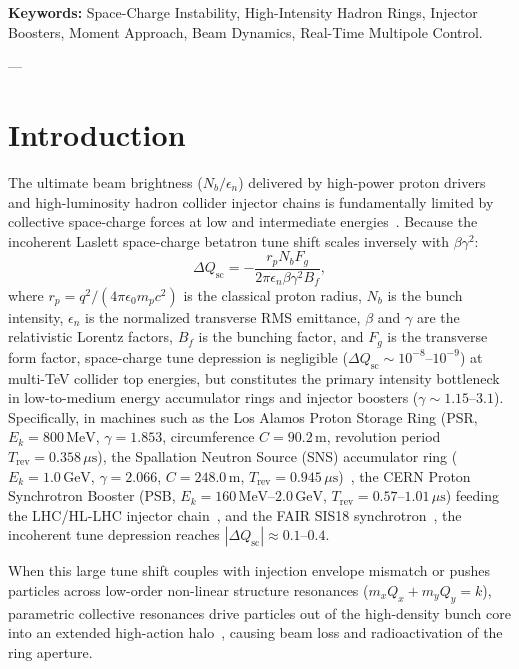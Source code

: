 \documentclass[11pt,a4paper]{article}
\begin{document}
\begin{abstract}
\end{abstract}

\noindent\textbf{Keywords:} Space-Charge Instability, High-Intensity Hadron Rings, Injector Boosters, Moment Approach, Beam Dynamics, Real-Time Multipole Control.

---

\section{Introduction}
The ultimate beam brightness ($N_b / \epsilon_n$) delivered by high-power proton drivers and high-luminosity hadron collider injector chains is fundamentally limited by collective space-charge forces at low and intermediate energies~\cite{reiser2008theory,baartman1998space}. Because the incoherent Laslett space-charge betatron tune shift scales inversely with $\beta \gamma^2$:
\begin{equation}
    \Delta Q_{\mathrm{sc}} = - \frac{r_p N_b F_g}{2 \pi \epsilon_n \beta \gamma^2 B_f},
    \label{eq:tune_shift}
\end{equation}
where $r_p = q^2 / (4\pi \epsilon_0 m_p c^2)$ is the classical proton radius, $N_b$ is the bunch intensity, $\epsilon_n$ is the normalized transverse RMS emittance, $\beta$ and $\gamma$ are the relativistic Lorentz factors, $B_f$ is the bunching factor, and $F_g$ is the transverse form factor, space-charge tune depression is negligible ($\Delta Q_{\mathrm{sc}} \sim 10^{-8}\text{--}10^{-9}$) at multi-TeV collider top energies, but constitutes the primary intensity bottleneck in low-to-medium energy accumulator rings and injector boosters ($\gamma \sim 1.15\text{--}3.1$). Specifically, in machines such as the Los Alamos Proton Storage Ring (PSR, $E_k = 800\,\mathrm{MeV}$, $\gamma = 1.853$, circumference $C = 90.2\,\mathrm{m}$, revolution period $T_{\mathrm{rev}} = 0.358\,\mu\mathrm{s}$), the Spallation Neutron Source (SNS) accumulator ring ($E_k = 1.0\,\mathrm{GeV}$, $\gamma = 2.066$, $C = 248.0\,\mathrm{m}$, $T_{\mathrm{rev}} = 0.945\,\mu\mathrm{s}$)~\cite{henderson2014spallation}, the CERN Proton Synchrotron Booster (PSB, $E_k = 160\,\mathrm{MeV}\text{--}2.0\,\mathrm{GeV}$, $T_{\mathrm{rev}} = 0.57\text{--}1.01\,\mu\mathrm{s}$) feeding the LHC/HL-LHC injector chain~\cite{fcc2019conceptual}, and the FAIR SIS18 synchrotron~\cite{fair2006accelerator}, the incoherent tune depression reaches $|\Delta Q_{\mathrm{sc}}| \approx 0.1\text{--}0.4$.

When this large tune shift couples with injection envelope mismatch or pushes particles across low-order non-linear structure resonances ($m_x Q_x + m_y Q_y = k$), parametric collective resonances drive particles out of the high-density bunch core into an extended high-action halo~\cite{fedotov2003space}, causing beam loss and radioactivation of the ring aperture.
\end{document}
